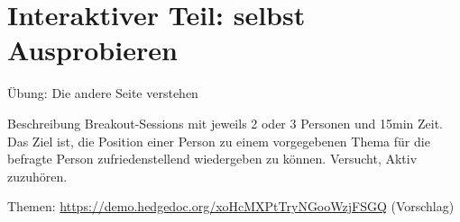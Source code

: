\section{Interaktiver Teil: selbst Ausprobieren}

\begin{frame}[c]{Übung: Die andere Seite verstehen}
    \large
    \begin{block}{Beschreibung}
    Breakout-Sessions mit jeweils 2 oder 3 Personen und 15min Zeit.
    Das Ziel ist, die Position einer Person zu einem vorgegebenen Thema
    für die befragte Person zufriedenstellend wiedergeben zu können.
    Versucht, Aktiv zuzuhören.
    \end{block}
    Themen: \url{https://demo.hedgedoc.org/xoHcMXPtTryNGooWzjFSGQ} (Vorschlag)
\end{frame}
